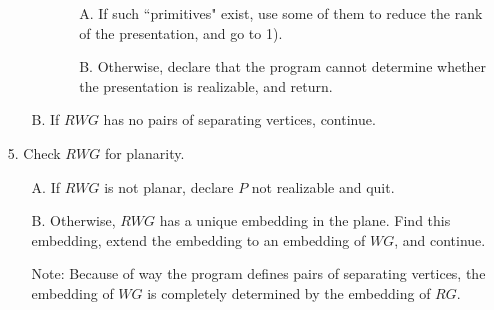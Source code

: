 \documentclass[12pt]{amsart}
\begin{document}
\begin{enumerate}
\begin{enumerate}
\begin{enumerate}
\begin{enumerate}
            A.  If such  ``primitives" exist, use some of them to reduce the rank
            of the presentation, and go to 1).
            
            B.  Otherwise, declare that the program cannot determine whether the
            presentation is realizable, and return.
          \end{enumerate}
        \end{enumerate}
      \item[B.]  If $RWG$ has no pairs of separating vertices, continue. 
      \end{enumerate}



    \item[5.]  Check $RWG$ for planarity.
      \begin{enumerate}
      \item[A.] If $RWG$ is not planar, declare $P$ not realizable and quit.
      \item[B.]  Otherwise, $RWG$ has a unique embedding in the plane. Find this embedding, extend
        the embedding to an embedding of $WG$, and continue.
        
        Note: Because of way the program defines pairs of separating vertices, the
        embedding of $WG$ is completely determined by the embedding of $RG$.
      \end{enumerate}


\end{enumerate}
\end{document}
